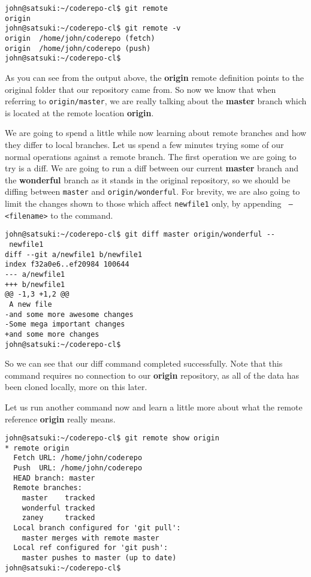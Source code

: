\begin{Verbatim}[frame=leftline,framerule=1mm,fontsize=\relsize{-3}] 
john@satsuki:~/coderepo-cl$ git remote
origin
john@satsuki:~/coderepo-cl$ git remote -v
origin	/home/john/coderepo (fetch)
origin	/home/john/coderepo (push)
john@satsuki:~/coderepo-cl$ 
\end{Verbatim}

As you can see from the output above, the \textbf{origin} remote definition points to the original folder that our repository came from.  So now we know that when referring to \texttt{origin/master}, we are really talking about the \textbf{master} branch which is located at the remote location \textbf{origin}.

We are going to spend a little while now learning about remote branches and how they differ to local branches.  Let us spend a few minutes trying some of our normal operations against a remote branch.  The first operation we are going to try is a diff.  We are going to run a diff between our current \textbf{master} branch and the \textbf{wonderful} branch as it stands in the original repository, so we should be diffing between \texttt{master} and \texttt{origin/wonderful}.  For brevity, we are also going to limit the changes shown to those which affect \texttt{newfile1} only, by appending \texttt{ -- <filename>} to the command.

\begin{Verbatim}[frame=leftline,framerule=1mm,fontsize=\relsize{-3}] 
john@satsuki:~/coderepo-cl$ git diff master origin/wonderful -- 
 newfile1
diff --git a/newfile1 b/newfile1
index f32a0e6..ef20984 100644
--- a/newfile1
+++ b/newfile1
@@ -1,3 +1,2 @@
 A new file
-and some more awesome changes
-Some mega important changes
+and some more changes
john@satsuki:~/coderepo-cl$ 
\end{Verbatim}

So we can see that our diff command completed successfully.  Note that this command requires no connection to our \textbf{origin} repository, as all of the data has been cloned locally, more on this later.  

Let us run another command now and learn a little more about what the remote reference \textbf{origin} really means.

\begin{Verbatim}[frame=leftline,framerule=1mm,fontsize=\relsize{-3}] 
john@satsuki:~/coderepo-cl$ git remote show origin
* remote origin
  Fetch URL: /home/john/coderepo
  Push  URL: /home/john/coderepo
  HEAD branch: master
  Remote branches:
    master    tracked
    wonderful tracked
    zaney     tracked
  Local branch configured for 'git pull':
    master merges with remote master
  Local ref configured for 'git push':
    master pushes to master (up to date)
john@satsuki:~/coderepo-cl$ 
\end{Verbatim}


